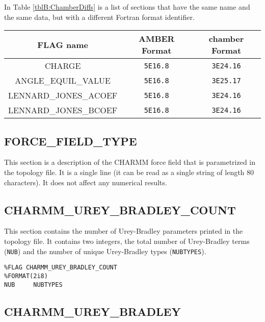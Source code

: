 In Table \ref{tblB:ChamberDiffs} is a list of sections that have the same name
and the same data, but with a different Fortran format identifier.

\begin{table*}
   \caption{List of flags that are common between Amber and chamber topology
            files, but have different {\tt FORMAT} identifiers.}
   \begin{tabular}{ccc}
      \hline
      FLAG name & AMBER Format & chamber Format \\
      \hline
      CHARGE & {\tt 5E16.8} & {\tt 3E24.16} \\
      ANGLE\_EQUIL\_VALUE & {\tt 5E16.8} & {\tt 3E25.17} \\
      LENNARD\_JONES\_ACOEF & {\tt 5E16.8} & {\tt 3E24.16} \\
      LENNARD\_JONES\_BCOEF & {\tt 5E16.8} & {\tt 3E24.16} \\
      \hline
   \end{tabular}
   \label{tblB:ChamberDiffs}
\end{table*}

\subsection*{FORCE\_FIELD\_TYPE}

This section is a description of the CHARMM force field that is parametrized in
the topology file. It is a single line (it can be read as a single string of
length 80 characters). It does not affect any numerical results.


\subsection*{CHARMM\_UREY\_BRADLEY\_COUNT}

This section contains the number of Urey-Bradley parameters printed in the
topology file. It contains two integers, the total number of Urey-Bradley terms
({\tt NUB}) and the number of unique Urey-Bradley types ({\tt NUBTYPES}).

\begin{verbatim}
%FLAG CHARMM_UREY_BRADLEY_COUNT
%FORMAT(2i8)
NUB     NUBTYPES
\end{verbatim}

\subsection*{CHARMM\_UREY\_BRADLEY}


